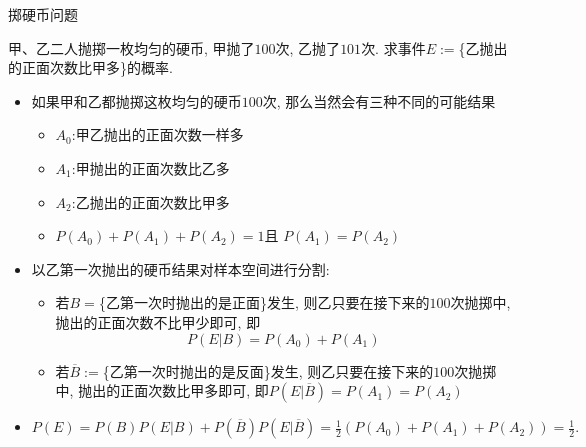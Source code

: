 \begin{frame}{掷硬币问题}
	\begin{exam}
		甲、乙二人抛掷一枚均匀的硬币, 甲抛了$100$次, 乙抛了$101$次. 求事件$E:=$\{乙抛出的正面次数比甲多\}的概率.
	\end{exam}

	\begin{jieda}
		\begin{itemize}[<+-|alert@+>]
			\item 如果甲和乙都抛掷这枚均匀的硬币$100$次, 那么当然会有三种不同的可能结果
			\begin{itemize}[<+-|alert@+>]
				\item $A_0$:\pause 甲乙抛出的正面次数一样多\pause
				\item $A_1$:\pause 甲抛出的正面次数比乙多\pause
				\item $A_2$:\pause 乙抛出的正面次数比甲多\pause
				\item $P(A_0)+P(A_1)+P(A_2)=1$\pause 且 $P(A_1)=P(A_2)$\pause
			\end{itemize}
			\item 以乙第一次抛出的硬币结果对样本空间进行分割:
			\begin{itemize}[<+-|alert@+>]
				\item 若$B=$\{乙第一次时抛出的是正面\}发生, 则\pause 乙只要在接下来的$100$次抛掷中, 抛出的正面次数不比甲少即可, 即
				\[P(E|B)=P(A_0)+P(A_1)\]
				\item 若$\overline{B}:=$\{乙第一次时抛出的是反面\}发生, 则\pause 乙只要在接下来的$100$次抛掷中, 抛出的正面次数比甲多即可, 即$P(E|\overline{B})=P(A_1)=P(A_2)$
			\end{itemize}
			\item $P(E)=P(B)P(E|B)+P(\overline{B})P(E|\overline{B})=\frac{1}{2}\left(P(A_0)+P(A_1)+P(A_2)\right)=\frac{1}{2}.$
		\end{itemize}
	\end{jieda}
\end{frame}




